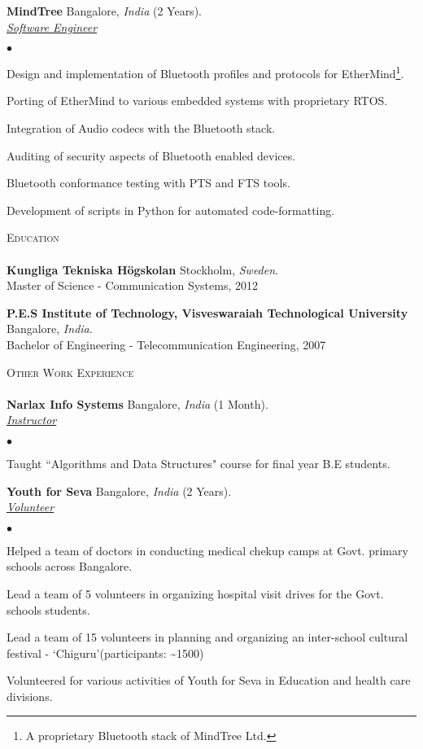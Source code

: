 \documentclass[a4paper]{article}
\newcommand{\lineunder}{\vspace*{-8pt} \\ \hspace*{-18pt} \hrulefill \\}
\newcommand{\header}[1]{{\hspace*{-15pt}\vspace*{6pt} \textsc{#1}} \vspace*{-6pt} \lineunder}
\newcommand{\employer}[4]{{ \textbf{#1} #2  (#3).\\ \underline{\emph{#4}}\\  }}
\newenvironment{achievements}{\begin{list}{$\bullet$}{\topsep 0pt \itemsep -2pt}}{\vspace*{4pt}\end{list}}
\newcommand{\school}[3]{
 \textbf{#1} #2 \\\vspace*{3pt} #3\\
\vspace*{5pt}
}
\begin{document}
\employer{MindTree} {Bangalore, \textit{India}}{2 Years} {Software Engineer}
	\begin{achievements}
	\item Design and implementation of Bluetooth profiles and protocols for EtherMind\footnote[2]{A proprietary Bluetooth stack of MindTree Ltd.}.
	\item Porting of EtherMind to various embedded systems with proprietary RTOS.
	\item Integration of Audio codecs with the Bluetooth stack.
	\item Auditing of security aspects of Bluetooth enabled devices.
	\item Bluetooth conformance testing with PTS and FTS tools.
	\item Development of scripts in Python for automated code-formatting.
	\end{achievements}

\header{Education}

\school{Kungliga Tekniska H\"{o}gskolan}{Stockholm, \textit{Sweden}.}
{Master of Science - Communication Systems, 2012}

\school{P.E.S Institute of Technology, Visveswaraiah Technological University}{Bangalore, \textit{India}.}{Bachelor of Engineering - Telecommunication Engineering, 2007}

\break
\header{Other Work Experience}
\employer{Narlax Info Systems} {Bangalore, \textit{India}}{1 Month}{Instructor}
	\begin{achievements}
	\item Taught ``Algorithms and Data Structures" course for final year B.E students.
	\end{achievements}

\employer{Youth for Seva}{Bangalore, \textit{India}}{2 Years}{Volunteer}
\begin{achievements}
\item Helped a team of doctors in conducting medical chekup camps at Govt. primary schools across Bangalore.
\item Lead a team of 5 volunteers in organizing hospital visit drives for the Govt. schools students.
\item Lead a team of 15 volunteers in planning and organizing an inter-school cultural festival - `Chiguru'(participants: \textasciitilde 1500)
\item Volunteered for various activities of Youth for Seva in Education and health care divisions.
\end{achievements}
\end{document}
